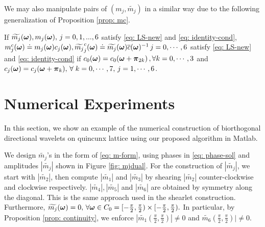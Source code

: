 We may also manipulate pairs of $(m_j,\widetilde{m_j})$ in a similar way due to the following generalization of Proposition \ref{prop: mc}.
\begin{proposition}\label{prop: mjc}
If $\widetilde{m_{j}}(\boldsymbol{\omega}), m_j(\boldsymbol{\omega}),\,  j = 0,1,...,6$ satisfy \eqref{eq: LS-new} and \eqref{eq: identity-cond}, 
$m_j^c(\boldsymbol{\omega})\doteq m_j(\boldsymbol{\omega})c_j(\boldsymbol{\omega}), \widetilde{m_j}^c_j(\boldsymbol{\omega})\doteq \widetilde{m_{j}}(\boldsymbol{\omega})\overline{c}(\boldsymbol{\omega})^{-1} \, j = 0,\cdots,6$ 
satisfy \eqref{eq: LS-new} and \eqref{eq: identity-cond} if $ c_0(\boldsymbol{\omega}) = c_0(\boldsymbol{\omega}+\boldsymbol{\pi}_{2k})\,,\forall k = 0,\cdots,3$ and $c_j(\boldsymbol{\omega}) = c_j(\boldsymbol{\omega} + \boldsymbol{\pi}_k),\, \forall \;k = 0,\cdots,7,\, j = 1,\cdots,6$.
\end{proposition}

\begin{comment}
\subsection{solving $m_i$}
In the final step, we substitute $\mc{0}$ and $m_0^C(\V{\omega})$ into \eqref{eq: LS-new} and rewrite it into the following linear system,
\begin{align}\label{eq: mi}
\overline{\M}[:,2:7]\,\mathbf{m}[2:7](\V{\omega}) = 
\begin{bmatrix}
1-m_0^C\overline{\widetilde{m_0}^C}(\V{\omega})\\
0\\
-m_0^C\overline{\widetilde{m_0}^C}(\V{\omega}+\V{\pi}_2)\\
\vdots \\
0
\end{bmatrix}
=:\mathbf{b}(\V{\omega}).
\end{align}
The solution of \eqref{eq: mi} depends only on $m_0^C\overline{\widetilde{m_0}^C}$, or equivalently $m_0\overline{\widetilde{m_0}}$. 
\end{comment}

\section{Numerical Experiments}

In this section, we show an example of the numerical construction of biorthogonal directional wavelets on quincunx lattice using our proposed algorithm in Matlab.

We design $\widetilde{m_j}$'s in the form of \eqref{eq: m-form}, using phases in \eqref{eq: phase-sol} and amplitudes $|\widetilde{m_j}|$ shown in Figure \ref{fig: mjdual}. For the construction of $|\widetilde{m_j}|$, we start with $|\widetilde{m_2}|$, then compute $|\widetilde{m_1}|$ and $|\widetilde{m_3}|$ by shearing $|\widetilde{m_2}|$ counter-clockwise and clockwise respectively. $|\widetilde{m_4}|, |\widetilde{m_5}|$ and $|\widetilde{m_6}|$ are obtained by symmetry along the diagonal. This is the same approach used in the shearlet construction. Furthermore, $\widetilde{m_{j}}(\boldsymbol{\omega}) = 0,\,\forall \boldsymbol{\omega}\in C_0 = [-\frac{\pi}{2},\frac{\pi}{2})\times [-\frac{\pi}{2},\frac{\pi}{2}).$ In particular, by Proposition \ref{prop: continuity}, we enforce $|\widetilde{m_1}(\frac{\pi}{2},\frac{\pi}{2})|\neq 0$ and $\widetilde{m_6}(\frac{\pi}{2},\frac{\pi}{2})|\neq 0$.

